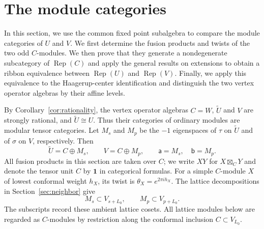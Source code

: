 \documentclass[11pt,reqno]{amsart}
\theoremstyle{definition}\newtheorem{definition}[theorem]{Definition}
\theoremstyle{remark}\newtheorem{remark}[theorem]{Remark}
\newcommand{\one}{\mathbf1}\newcommand{\slc}{\mathfrak{sl}_2}
\newcommand{\Rep}{\operatorname{Rep}}
\numberwithin{equation}{section}
\begin{document}
\section{The module categories}\label{sec:categories}
\begingroup
In this section, we use the common fixed point subalgebra to compare the module categories of $U$ and $V$. We first determine the fusion products and twists of the two odd $C$-modules. We then prove that they generate a nondegenerate subcategory of $\Rep(C)$ and apply the general results on extensions to obtain a ribbon equivalence between $\Rep(U)$ and $\Rep(V)$. Finally, we apply this equivalence to the Haagerup-center identification and distinguish the two vertex operator algebras by their affine levels.

By Corollary~\ref{cor:rationality}, the vertex operator algebras $C=W$, $\widetilde U$ and $V$ are strongly rational, and $\widetilde U\cong U$. Thus their categories of ordinary modules are modular tensor categories. Let $M_s$ and $M_p$ be the $-1$ eigenspaces of $\tau$ on $\widetilde U$ and of $\sigma$ on $V$, respectively. Then
\begin{equation}
 \widetilde U=C\oplus M_s,\qquad V=C\oplus M_p,
 \qquad \mathsf a=M_s,\quad \mathsf b=M_p.
\end{equation}
All fusion products in this section are taken over $C$; we write $XY$ for $X\boxtimes_C Y$ and denote the tensor unit $C$ by $\one$ in categorical formulas. For a simple $C$-module $X$ of lowest conformal weight $h_X$, its twist is $\theta_X=e^{2\pi i h_X}$. The lattice decompositions in Section~\ref{sec:neighbor} give
\[
 M_s\subset V_{s+L_0},\qquad M_p\subset V_{p+L_0}.
\]
The subscripts record these ambient lattice cosets. All lattice modules below are regarded as $C$-modules by restriction along the conformal inclusion $C\subset V_{L_0}$.
\end{document}
